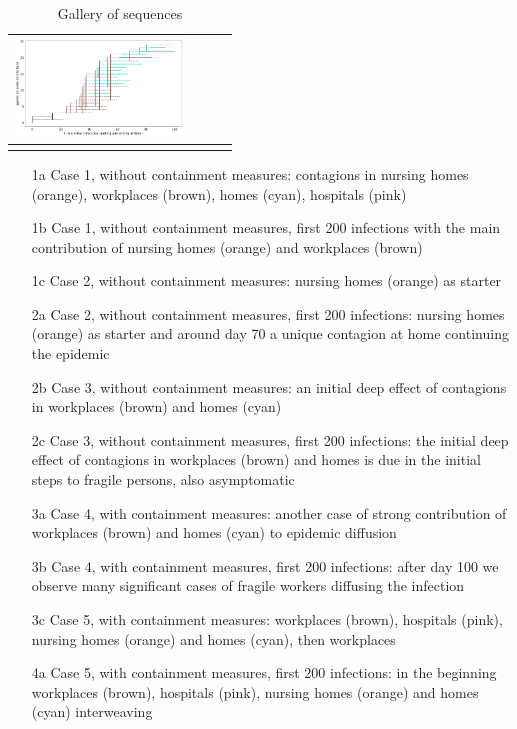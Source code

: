 \documentclass[graybox]{svmult}
\begin{document}
\begin{table}
\begin{tabular}{cccc}
      \includegraphics[width=12em]{sequences/withShort2.png}             %
\\
           \hline\noalign{\smallskip}
        \end{tabular}
        \caption{Gallery of sequences}
        \label{gallery}
    \end{table}

\begin{itemize}
\item [1a] Case 1, without containment measures: contagions in nursing homes (orange), workplaces (brown), homes (cyan), hospitals (pink)
\item [1b] Case 1, without containment measures, first 200 infections with the main contribution of nursing homes (orange) and workplaces (brown)
\item [1c] Case 2, without containment measures: nursing homes (orange) as starter
\item [2a] Case 2, without containment measures, first 200 infections: nursing homes (orange) as starter and around day 70 a unique contagion at home continuing the epidemic
\item [2b] Case 3, without containment measures: an initial deep effect of contagions in workplaces (brown) and homes (cyan)
\item [2c] Case 3, without containment measures, first 200 infections: the initial deep effect of contagions in workplaces (brown) and homes is due in the initial steps to fragile persons, also asymptomatic
\item [3a] Case 4, with containment measures: another case of strong contribution of workplaces (brown) and homes (cyan) to epidemic diffusion
\item [3b] Case 4, with containment measures, first 200 infections: after day 100 we observe many significant cases of fragile workers diffusing the infection
\item [3c] Case 5, with containment measures: workplaces (brown), hospitals (pink), nursing homes (orange) and homes (cyan), then workplaces
\item [4a] Case 5, with containment measures, first 200 infections: in the beginning workplaces (brown), hospitals (pink), nursing homes (orange) and homes (cyan) interweaving

\end{itemize}
\end{document}
